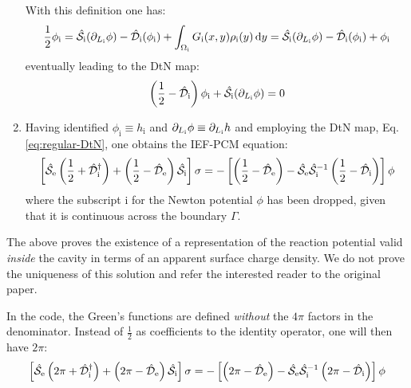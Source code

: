 \begin{enumerate}
    With this definition one has:
    \begin{equation}
      \frac{1}{2}\phi_\mathrm{i} =
      \hat{\mathcal{S}}_\mathrm{i}(\partial_{L_\mathrm{i}} \phi) -
      \hat{\mathcal{D}}_\mathrm{i}(\phi_\mathrm{i}) + \int_{\Omega_\mathrm{i}}G_\mathrm{i}(x, y)\rho_\mathrm{i}(y)\mathop{}\!\mathrm{d} y
      =
      \hat{\mathcal{S}}_\mathrm{i}(\partial_{L_\mathrm{i}} \phi) -
      \hat{\mathcal{D}}_\mathrm{i}(\phi_\mathrm{i}) + \phi_\mathrm{i}
    \end{equation}
    eventually leading to the DtN map:
    \begin{equation}\label{eq:regular-DtN}
      \left(\frac{1}{2} - \hat{\mathcal{D}}_\mathrm{i}\right)\phi_\mathrm{i}
      +\hat{\mathcal{S}}_\mathrm{i}(\partial_{L_\mathrm{i}} \phi) = 0
    \end{equation}
  \item Having identified $\phi_\mathrm{i} \equiv h_\mathrm{i}$
    and $\partial_{L_\mathrm{i}} \phi \equiv \partial_{L_\mathrm{i}} h$ and employing the DtN map,
    Eq.\eqref{eq:regular-DtN}, one obtains the IEF-PCM equation:
    \begin{equation}\label{eq:regular-IEF}
      \left[ \hat{\mathcal{S}}_\mathrm{e}\left(\frac{1}{2} + \hat{\mathcal{D}}^\dagger_\mathrm{i}\right)
      +
      \left(\frac{1}{2} - \hat{\mathcal{D}}_\mathrm{e}\right)\hat{\mathcal{S}}_\mathrm{i}
      \right]\sigma =
      -\left[\left(\frac{1}{2}-\hat{\mathcal{D}}_\mathrm{e}\right)
      -\hat{\mathcal{S}}_\mathrm{e}\hat{\mathcal{S}}_\mathrm{i}^{-1}
       \left(\frac{1}{2}-\hat{\mathcal{D}}_\mathrm{i}\right)
      \right]\phi
    \end{equation}
    where the subscript $\mathrm{i}$ for the Newton potential $\phi$ has
    been dropped, given that it is continuous across the boundary
    $\Gamma$.
\end{enumerate}
The above proves the existence of a representation of the reaction
potential valid \emph{inside} the cavity in terms of an apparent surface
charge density. We do not prove the uniqueness of this solution and
refer the interested reader to the original paper.~\autocite{Cances1998}

In the code, the Green's functions are defined \emph{without} the $4\pi$
factors in the denominator. Instead of $\frac{1}{2}$ as coefficients to
the identity operator, one will then have $2\pi$:
\begin{equation}\label{eq:regular-IEF-2pi}
  \left[ \hat{\mathcal{S}}_\mathrm{e}\left(2\pi + \hat{\mathcal{D}}^\dagger_\mathrm{i}\right)
  +
  \left(2\pi - \hat{\mathcal{D}}_\mathrm{e}\right)\hat{\mathcal{S}}_\mathrm{i}
  \right]\sigma =
  -\left[\left(2\pi-\hat{\mathcal{D}}_\mathrm{e}\right)
  -\hat{\mathcal{S}}_\mathrm{e}\hat{\mathcal{S}}_\mathrm{i}^{-1}
  \left(2\pi-\hat{\mathcal{D}}_\mathrm{i}\right)
  \right]\phi
\end{equation}

